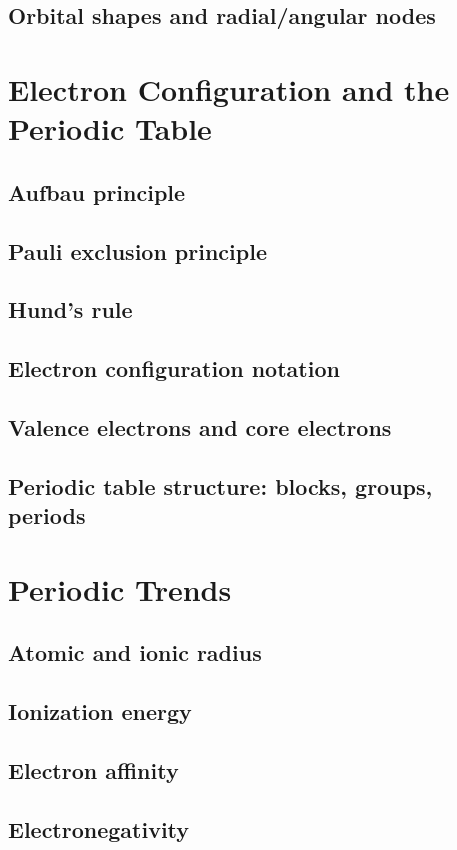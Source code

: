 \documentclass[11pt]{article}
\begin{document}
	\subsection{Orbital shapes and radial/angular nodes}

\section{Electron Configuration and the Periodic Table}
	\subsection{Aufbau principle}
	\subsection{Pauli exclusion principle}
	\subsection{Hund's rule}
	\subsection{Electron configuration notation}
	\subsection{Valence electrons and core electrons}
	\subsection{Periodic table structure: blocks, groups, periods}

\section{Periodic Trends}
	\subsection{Atomic and ionic radius}
	\subsection{Ionization energy}
	\subsection{Electron affinity}
	\subsection{Electronegativity}
\end{document}

